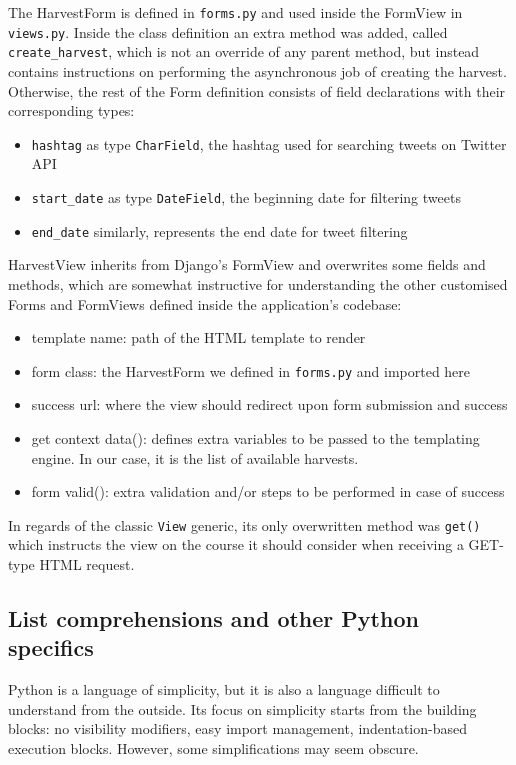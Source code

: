 \documentclass[12pt,a4paper,twoside]{report}
\begin{document}
The HarvestForm is defined in \texttt{forms.py} and used inside the FormView in \texttt{views.py}. Inside the class definition an extra method was added, called \texttt{create\_harvest}, which is not an override of any parent method, but instead contains instructions on performing the asynchronous job of creating the harvest. Otherwise, the rest of the Form definition consists of field declarations with their corresponding types:

\begin{itemize}
\item \texttt{hashtag} as type \texttt{CharField}, the hashtag used for searching tweets on Twitter API
\item \texttt{start\_date} as type \texttt{DateField}, the beginning date for filtering tweets
\item \texttt{end\_date} similarly, represents the end date for tweet filtering
\end{itemize}

HarvestView inherits from Django's FormView and overwrites some fields and methods, which are somewhat instructive for understanding the other customised Forms and FormViews defined inside the application's codebase:

\begin{itemize}
\item template name: path of the HTML template to render
\item form class: the HarvestForm we defined in \texttt{forms.py} and imported here
\item success url: where the view should redirect upon form submission and success
\item get context data(): defines extra variables to be passed to the templating engine. In our case, it is the list of available harvests.
\item form valid(): extra validation and/or steps to be performed in case of success
\end{itemize}

In regards of the classic \texttt{View} generic, its only overwritten method was \texttt{get()} which instructs the view on the course it should consider when receiving a GET-type HTML request.

\subsection{List comprehensions and other Python specifics}
Python is a language of simplicity, but it is also a language difficult to understand from the outside. Its focus on simplicity starts from the building blocks: no visibility modifiers, easy import management, indentation-based execution blocks. However, some simplifications may seem obscure.
\end{document}
